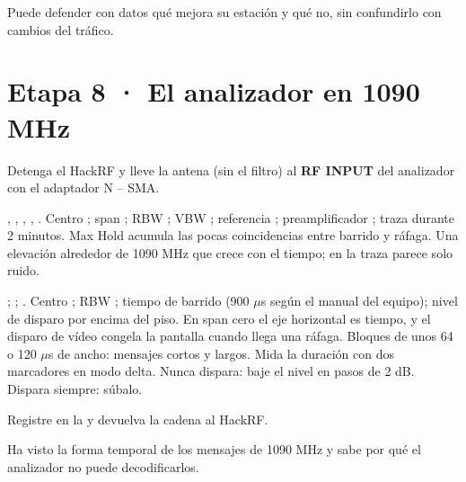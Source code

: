 \begin{logro}
Puede defender con datos qué mejora su estación y qué no, sin confundirlo con cambios del tráfico.
\end{logro}

\section{Etapa 8 · El analizador en 1090 MHz}
\label{sec:u-siglent}


Detenga el HackRF y lleve la antena (sin el filtro) al \textbf{RF INPUT} del analizador con el adaptador N -- SMA.

{, , , , .}
{Centro ; span ; RBW ; VBW ; referencia ; preamplificador ; traza  durante 2 minutos.}
{Max Hold acumula las pocas coincidencias entre barrido y ráfaga.}
{Una elevación alrededor de 1090 MHz que crece con el tiempo; en  la traza parece solo ruido.}
{}
{}

{; ; .}
{Centro ; RBW ; tiempo de barrido  (900 $\mu$s según el manual del equipo); nivel de disparo  por encima del piso.}
{En span cero el eje horizontal es tiempo, y el disparo de vídeo congela la pantalla cuando llega una ráfaga.}
{Bloques de unos 64 o 120 $\mu$s de ancho: mensajes cortos y largos.}
{Mida la duración con dos marcadores en modo delta.}
{Nunca dispara: baje el nivel en pasos de 2 dB. Dispara siempre: súbalo.}

Registre en la  y devuelva la cadena al HackRF.


\begin{logro}
Ha visto la forma temporal de los mensajes de 1090 MHz y sabe por qué el analizador no puede decodificarlos.
\end{logro}

